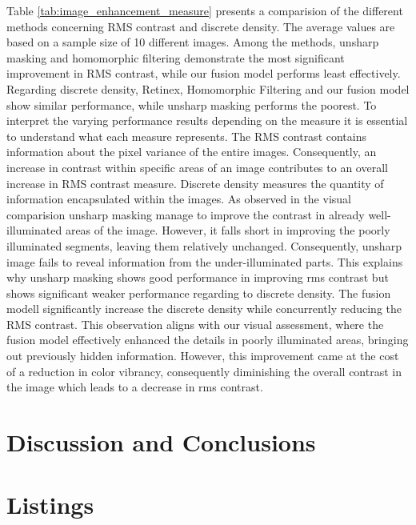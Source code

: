 \documentclass[sigconf]{acmart}
\begin{document}
 
Table \ref{tab:image_enhancement_measure} presents a comparision of the different methods concerning RMS contrast and discrete density. The average values are based on a sample size of 10 different images. Among the methods, unsharp masking and homomorphic filtering demonstrate the most significant improvement in RMS contrast, while our fusion model performs least effectively. Regarding discrete density, Retinex, Homomorphic Filtering and our fusion model show similar performance, while unsharp masking performs the poorest.
To interpret the varying performance results depending on the measure it is essential to understand what each measure represents. The RMS contrast contains information about the pixel variance of the entire images. Consequently, an increase in contrast within specific areas of an image contributes to an overall increase in RMS contrast measure. Discrete density measures the quantity of information encapsulated within the images. As observed in the visual comparision unsharp masking manage to improve the contrast in already well-illuminated areas of the image. However, it falls short in improving the poorly illuminated segments, leaving them relatively unchanged. Consequently, unsharp image fails to reveal information from the under-illuminated parts. This explains why unsharp masking shows good performance in improving rms contrast but shows significant weaker performance regarding to discrete density.
The fusion modell significantly increase the discrete density while concurrently reducing the RMS contrast. This observation aligns with our visual assessment, where the fusion model effectively enhanced the details in poorly illuminated areas, bringing out previously hidden information. However, this improvement came at the cost of a reduction in color vibrancy, consequently diminishing the overall contrast in the image which leads to a decrease in rms contrast.


\section{Discussion and Conclusions}







\newpage
\appendix

\section{Listings}
\end{document}
